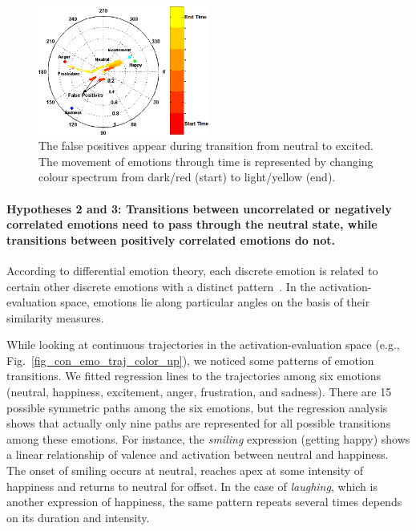 \documentclass[10pt,journal,cspaper,compsoc]{IEEEtran}
\begin{document}
\begin{figure}[!ht]
\centering
\includegraphics[width=0.5\textwidth]{figures/Ch7/false_pos_color.png}
\caption{The false positives appear during transition from neutral to excited. The movement of emotions through time is represented by changing colour spectrum from dark/red (start) to light/yellow (end).}
\label{fig_false_pos}
\end{figure}

\paragraph*{Hypotheses 2 and 3: Transitions between uncorrelated or negatively correlated emotions need to pass through the neutral state, while transitions between positively correlated emotions do not.}
\label{para_hypothesis_2_3}

According to differential emotion theory, each discrete emotion is related to certain other discrete emotions with a distinct pattern~\cite{blumberg1991patterns}. In the activation-evaluation space, emotions lie along particular angles on the basis of their similarity measures.


While looking at  continuous trajectories in the activation-evaluation space (e.g., Fig.~\ref{fig_con_emo_traj_color_up}), we noticed some patterns of emotion transitions. We fitted regression lines to the trajectories among six emotions (neutral, happiness, excitement, anger, frustration, and sadness). There are 15 possible symmetric paths among the six emotions, but the regression analysis shows that actually only nine paths are represented for all possible transitions among these emotions. For instance, the \emph{smiling} expression (getting happy) shows a linear relationship of valence and activation between neutral and happiness. The onset of smiling occurs at neutral, reaches apex at some intensity of happiness and returns to neutral for offset. In the case of \emph{laughing}, which is another expression of happiness, the same pattern repeats several times depends on its duration and intensity.
\end{document}
